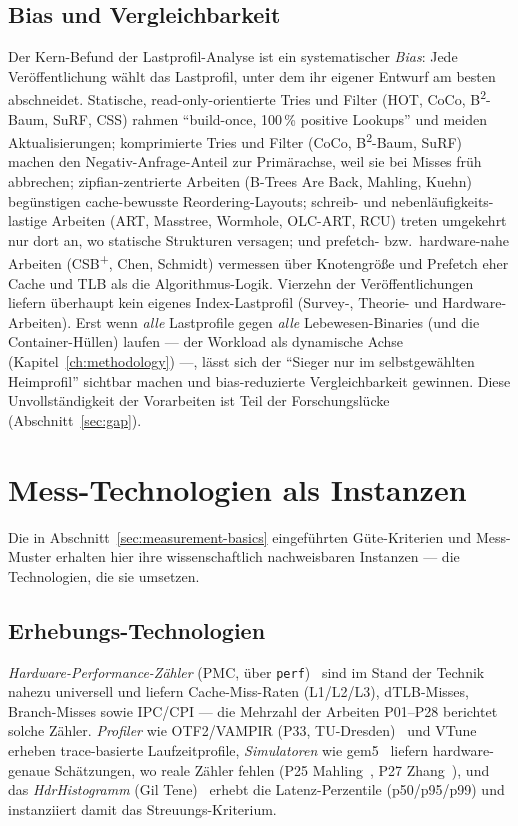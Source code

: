 \subsection{Bias und Vergleichbarkeit}\label{ssec:sota-wl-bias}
Der Kern-Befund der Lastprofil-Analyse ist ein systematischer \emph{Bias}: Jede Veröffentlichung
wählt das Lastprofil, unter dem ihr eigener Entwurf am besten abschneidet. Statische,
read-only-orientierte Tries und Filter (HOT, CoCo, B\textsuperscript{2}-Baum, SuRF, CSS) rahmen
\enquote{build-once, 100\,\% positive Lookups} und meiden Aktualisierungen; komprimierte Tries und
Filter (CoCo, B\textsuperscript{2}-Baum, SuRF) machen den Negativ-Anfrage-Anteil zur Primärachse,
weil sie bei Misses früh abbrechen; zipfian-zentrierte Arbeiten (B-Trees Are Back, Mahling, Kuehn)
begünstigen cache-bewusste Reordering-Layouts; schreib- und nebenläufigkeits-lastige Arbeiten (ART,
Masstree, Wormhole, OLC-ART, RCU) treten umgekehrt nur dort an, wo statische Strukturen versagen;
und prefetch- bzw.\ hardware-nahe Arbeiten (CSB\textsuperscript{+}, Chen, Schmidt) vermessen über
Knotengröße und Prefetch eher Cache und TLB als die Algorithmus-Logik. Vierzehn der
Veröffentlichungen liefern überhaupt kein eigenes Index-Lastprofil (Survey-, Theorie- und
Hardware-Arbeiten). Erst wenn \emph{alle} Lastprofile gegen \emph{alle} Lebewesen-Binaries (und die
Container-Hüllen) laufen --- der Workload als dynamische Achse (Kapitel~\ref{ch:methodology}) ---,
lässt sich der \enquote{Sieger nur im selbstgewählten Heimprofil} sichtbar machen und
bias-reduzierte Vergleichbarkeit gewinnen. Diese Unvollständigkeit der Vorarbeiten ist Teil der
Forschungslücke (Abschnitt~\ref{sec:gap}).

\section{Mess-Technologien als Instanzen}\label{sec:sota-measurement}
Die in Abschnitt~\ref{sec:measurement-basics} eingeführten Güte-Kriterien und Mess-Muster erhalten
hier ihre wissenschaftlich nachweisbaren Instanzen --- die Technologien, die sie umsetzen.

\subsection{Erhebungs-Technologien}\label{ssec:sota-meas-tech}
\emph{Hardware-Performance-Zähler} (PMC, über \texttt{perf})~\cite{demelo2010perf} sind im Stand der
Technik nahezu universell und liefern Cache-Miss-Raten (L1/L2/L3), dTLB-Misses, Branch-Misses sowie
IPC/CPI --- die Mehrzahl der Arbeiten P01--P28 berichtet solche Zähler\@. \emph{Profiler} wie
OTF2/VAMPIR (P33, TU-Dresden)~\cite{berthold2023vampir} und VTune~\cite{reinders2005vtune} erheben
trace-basierte Laufzeitprofile, \emph{Simulatoren} wie gem5~\cite{binkert2011gem5} liefern
hardware-genaue Schätzungen, wo reale Zähler fehlen (P25 Mahling~\cite{mahling2025hotpath}, P27
Zhang~\cite{zhang2025hierarchical}), und das \emph{HdrHistogramm} (Gil
Tene)~\cite{tene_hdrhistogram} erhebt die Latenz-Perzentile (p50/p95/p99) und instanziiert damit das
Streuungs-Kriterium.


